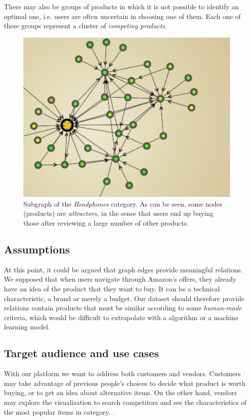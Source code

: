 \documentclass[a4paper,12pt]{article}
\begin{document}
There may also be groups of products in which it is not possible to identify an optimal one, i.e. users are often uncertain in choosing one of them. Each one of these groups represent a cluster of \textit{competing products}.

\begin{figure}[H]
	\centering{}
	\includegraphics[width=\textwidth]{img/graph_example.png}
	\caption{Subgraph of the \emph{Headphones} category. As can be seen, some nodes (products) are \emph{attractors}, in the sense that users end up buying those after reviewing a large number of other products.}
	\label{fig:graphNav}
\end{figure}
\subsection{Assumptions}
At this point, it could be argued that graph edges provide meaningful relations. We supposed that when users navigate through Amazon's offers, they already have an idea of the product that they want to buy. It can be a technical characteristic, a brand or merely a budget. Our dataset should therefore provide relations contain products that must be similar according to some \textit{human-made} criteria, which would be difficult to extrapolate with a algorithm or a machine learning model.

\subsection{Target audience and use cases}
With our platform we want to address both customers and vendors. Customers may take advantage of previous people's choices to decide what product is worth buying, or to get an idea about alternative items. On the other hand, vendors may explore the visualization to search competitors and see the characteristics of the most popular items in category. .
\end{document}
